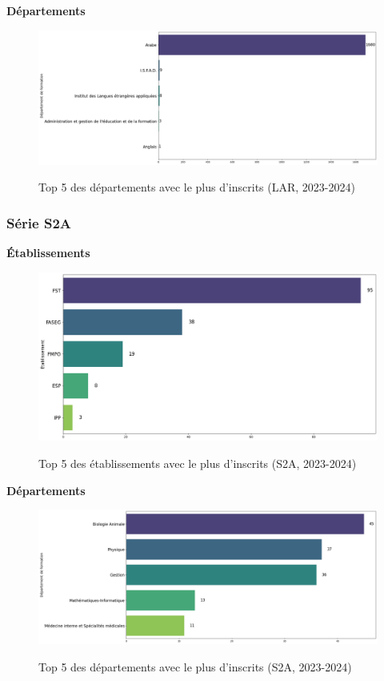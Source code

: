 \textbf{Départements}

\begin{figure}[ht]
\centering
\caption{Top 5 des départements avec le plus d'inscrits (LAR, 2023-2024)}
\includegraphics[width=1\textwidth]{figure/dep_LAR_2024.png}
\label{fig:dep_lar_2024}
\end{figure}

\newpage
\subsubsection{Série S2A}

\textbf{Établissements}

\begin{figure}[ht]
\centering
\caption{Top 5 des établissements avec le plus d'inscrits (S2A, 2023-2024)}
\includegraphics[width=1\textwidth]{figure/etab_S2A_2024.png}
\label{fig:etab_s2a_2024}
\end{figure}

\textbf{Départements}

\begin{figure}[ht]
\centering
\caption{Top 5 des départements avec le plus d'inscrits (S2A, 2023-2024)}
\includegraphics[width=1\textwidth]{figure/dep_S2A_2024.png}
\label{fig:dep_s2a_2024}
\end{figure}


